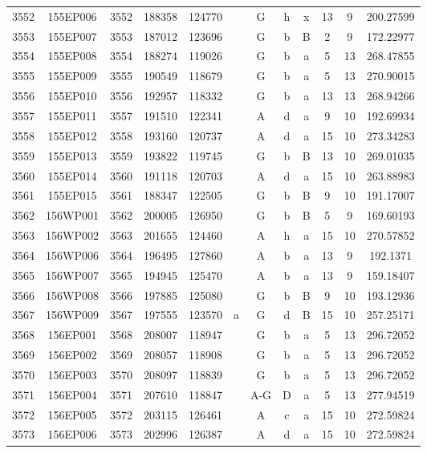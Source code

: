 \begin{tabular}{|*{12}{c|}}
3552 & 155EP006 & 3552 & 188358 & 124770 &  & G & h & x & 13 & 9 & 200.27599 \\ 
3553 & 155EP007 & 3553 & 187012 & 123696 &  & G & b & B & 2 & 9 & 172.22977 \\ 
3554 & 155EP008 & 3554 & 188274 & 119026 &  & G & b & a & 5 & 13 & 268.47855 \\ 
3555 & 155EP009 & 3555 & 190549 & 118679 &  & G & b & a & 5 & 13 & 270.90015 \\ 
3556 & 155EP010 & 3556 & 192957 & 118332 &  & G & b & a & 13 & 13 & 268.94266 \\ 
3557 & 155EP011 & 3557 & 191510 & 122341 &  & A & d & a & 9 & 10 & 192.69934 \\ 
3558 & 155EP012 & 3558 & 193160 & 120737 &  & A & d & a & 15 & 10 & 273.34283 \\ 
3559 & 155EP013 & 3559 & 193822 & 119745 &  & G & b & B & 13 & 10 & 269.01035 \\ 
3560 & 155EP014 & 3560 & 191118 & 120703 &  & A & d & a & 15 & 10 & 263.88983 \\ 
3561 & 155EP015 & 3561 & 188347 & 122505 &  & G & b & B & 9 & 10 & 191.17007 \\ 
3562 & 156WP001 & 3562 & 200005 & 126950 &  & G & b & B & 5 & 9 & 169.60193 \\ 
3563 & 156WP002 & 3563 & 201655 & 124460 &  & A & h & a & 15 & 10 & 270.57852 \\ 
3564 & 156WP006 & 3564 & 196495 & 127860 &  & A & b & a & 13 & 9 & 192.1371 \\ 
3565 & 156WP007 & 3565 & 194945 & 125470 &  & A & b & a & 13 & 9 & 159.18407 \\ 
3566 & 156WP008 & 3566 & 197885 & 125080 &  & G & b & B & 9 & 10 & 193.12936 \\ 
3567 & 156WP009 & 3567 & 197555 & 123570 & a & G & d & B & 15 & 10 & 257.25171 \\ 
3568 & 156EP001 & 3568 & 208007 & 118947 &  & G & b & a & 5 & 13 & 296.72052 \\ 
3569 & 156EP002 & 3569 & 208057 & 118908 &  & G & b & a & 5 & 13 & 296.72052 \\ 
3570 & 156EP003 & 3570 & 208097 & 118839 &  & G & b & a & 5 & 13 & 296.72052 \\ 
3571 & 156EP004 & 3571 & 207610 & 118847 &  & A-G & D & a & 5 & 13 & 277.94519 \\ 
3572 & 156EP005 & 3572 & 203115 & 126461 &  & A & c & a & 15 & 10 & 272.59824 \\ 
3573 & 156EP006 & 3573 & 202996 & 126387 &  & A & d & a & 15 & 10 & 272.59824 \\ 

\end{tabular}
